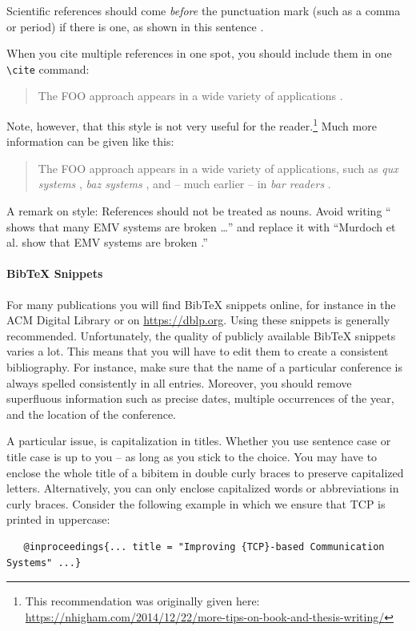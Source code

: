 Scientific references should come \emph{before} the punctuation mark (such as a comma or period) if there is one, as shown in this sentence \cite{Hintz02}.

When you cite multiple references in one spot, you should include them in one \verb|\cite| command:
\begin{quote}
  The FOO approach appears in a wide variety of applications \cite{murdoch_steven_j._chip_2010,anderson_ross_emv:_2014,kou_weidong_secure_2003}.
\end{quote}

Note, however, that this style is not very useful for the reader.\footnote{This recommendation was originally given here: \url{https://nhigham.com/2014/12/22/more-tips-on-book-and-thesis-writing/}} Much more information can be given like this:
\begin{quote}
The FOO approach appears in a wide variety of applications, such as \emph{qux systems} \cite{murdoch_steven_j._chip_2010}, \emph{baz systems} \cite{anderson_ross_emv:_2014}, and -- much earlier -- in \emph{bar readers} \cite{kou_weidong_secure_2003}.
\end{quote}

A remark on style: References should not be treated as nouns. Avoid writing ``\cite{murdoch_steven_j._chip_2010} shows that many EMV systems are broken \ldots'' and replace it with ``Murdoch et al. show that EMV systems are broken  \cite{murdoch_steven_j._chip_2010}.''

\paragraph{BibTeX Snippets}

For many publications you will find BibTeX snippets online, for instance in the ACM Digital Library or on \url{https://dblp.org}. Using these snippets is generally recommended. Unfortunately, the quality of publicly available BibTeX snippets varies a lot. This means that you will have to edit them to create a consistent bibliography. For instance, make sure that the name of a particular conference is always spelled consistently in all entries. Moreover, you should remove superfluous information such as precise dates, multiple occurrences of the year, and the location of the conference.

A particular issue, is capitalization in titles. Whether you use sentence case or title case is up to you -- as long as you stick to the choice. You may have to enclose the whole title of a bibitem in double curly braces to preserve capitalized letters. Alternatively, you can only enclose capitalized words or abbreviations in curly braces. Consider the following example in which we ensure that TCP is printed in uppercase:
\begin{verbatim}
   @inproceedings{... title = "Improving {TCP}-based Communication Systems" ...}
\end{verbatim}

